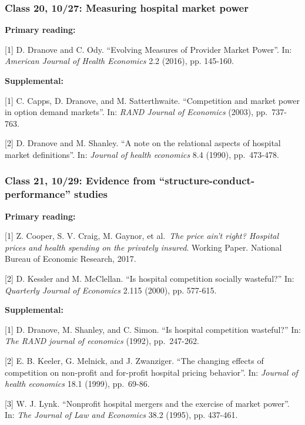 \documentclass[11pt,]{article}
\begin{document}
\hypertarget{class-20-1027-measuring-hospital-market-power}{%
\subsubsection{Class 20, 10/27: Measuring hospital market
power}\label{class-20-1027-measuring-hospital-market-power}}

\textbf{Primary reading:}

{[}1{]} D. Dranove and C. Ody. ``Evolving Measures of Provider Market
Power''. In: \emph{American Journal of Health Economics} 2.2 (2016), pp.
145-160.

\textbf{Supplemental:}

{[}1{]} C. Capps, D. Dranove, and M. Satterthwaite. ``Competition and
market power in option demand markets''. In: \emph{RAND Journal of
Economics} (2003), pp.~737-763.

{[}2{]} D. Dranove and M. Shanley. ``A note on the relational aspects of
hospital market definitions''. In: \emph{Journal of health economics}
8.4 (1990), pp.~473-478.

\hypertarget{class-21-1029-evidence-from-structure-conduct-performance-studies}{%
\subsubsection{Class 21, 10/29: Evidence from
``structure-conduct-performance''
studies}\label{class-21-1029-evidence-from-structure-conduct-performance-studies}}

\textbf{Primary reading:}

{[}1{]} Z. Cooper, S. V. Craig, M. Gaynor, et al.~\emph{The price ain't
right? Hospital prices and health spending on the privately insured}.
Working Paper. National Bureau of Economic Research, 2017.

{[}2{]} D. Kessler and M. McClellan. ``Is hospital competition socially
wasteful?'' In: \emph{Quarterly Journal of Economics} 2.115 (2000), pp.
577-615.

\textbf{Supplemental:}

{[}1{]} D. Dranove, M. Shanley, and C. Simon. ``Is hospital competition
wasteful?'' In: \emph{The RAND journal of economics} (1992),
pp.~247-262.

{[}2{]} E. B. Keeler, G. Melnick, and J. Zwanziger. ``The changing
effects of competition on non-profit and for-profit hospital pricing
behavior''. In: \emph{Journal of health economics} 18.1 (1999),
pp.~69-86.

{[}3{]} W. J. Lynk. ``Nonprofit hospital mergers and the exercise of
market power''. In: \emph{The Journal of Law and Economics} 38.2 (1995),
pp. 437-461.
\end{document}

